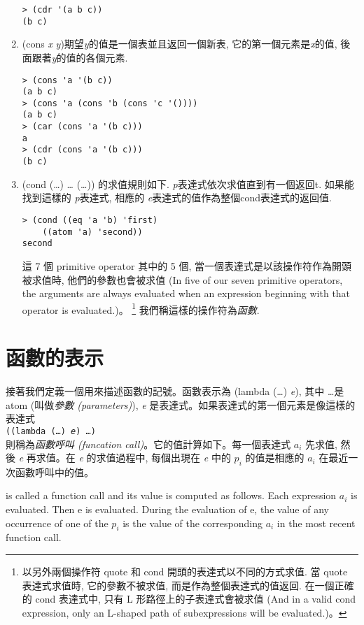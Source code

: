 \documentclass[12pt]{article}
\begin{document}
\begin{CJK}{UTF8}{bsmi}
\begin{enumerate}
\begin{verbatim} 
> (cdr '(a b c)) 
(b c) 
\end{verbatim} 
\item 
(cons {\it x} {\it y})期望{\it y}的值是一個表並且返回一個新表, 它的第一個元素是{\it x}的值,
後面跟著{\it y}的值的各個元素. 
\begin{verbatim} 
> (cons 'a '(b c)) 
(a b c) 
> (cons 'a (cons 'b (cons 'c '()))) 
(a b c) 
> (car (cons 'a '(b c))) 
a 
> (cdr (cons 'a '(b c))) 
(b c) 
\end{verbatim} 
\item 
(cond 
(\pone\dots\eone) 
\dots 
(\pn\dots\en)) 
的求值規則如下. 
{\it p}表達式依次求值直到有一個返回t. 
如果能找到這樣的{\it 
p}表達式, 相應的{\it 
e}表達式的值作為整個cond表達式的返回值. 
\begin{verbatim} 
> (cond ((eq 'a 'b) 'first) 
    ((atom 'a) 'second)) 
second 
\end{verbatim} 
這 7 個 primitive operator 其中的 5 個, 當一個表達式是以該操作符作為開頭被求值時, 他們的參數也會被求值
(In five of our seven primitive operators, the arguments are always evaluated 
when an expression beginning with that operator is evaluated.)。
\footnote{以另外兩個操作符 quote 和 cond 開頭的表達式以不同的方式求值.
當 quote 表達式求值時, 它的參數不被求值, 而是作為整個表達式的值返回. 
在一個正確的 cond 表達式中, 只有 L 形路徑上的子表達式會被求值
(And in a valid cond expression, only an L-shaped path of subexpressions will be evaluated.)。} 
我們稱這樣的操作符為{\em 函數}. 
\end{enumerate} 

\section{函數的表示} 

接著我們定義一個用來描述函數的記號。函數表示為
(lambda (\pone\dots\pn) {\it e}),
其中 \pone\dots\pn 是 atom (叫做{\em 參數 (parameters)}),
{\it e} 是表達式。如果表達式的第一個元素是像這樣的表達式\\
{\tt ((lambda (\pone\dots\pn) {\it e}) \aone\dots\an)} \\
則稱為{\em 函數呼叫 (funcation call)}。它的值計算如下。每一個表達式
{$a_{i}$} 先求值, 然後 {\it e} 再求值。在 {\it e}
的求值過程中, 每個出現在 {\it e} 中的 {$p_{i}$} 的值是相應的
{$a_{i}$} 在最近一次函數呼叫中的值。 

is called a function call and its value is computed as follows. Each expression
{$a_{i}$} is evaluated. Then e is evaluated. During the evaluation of e, the value of any occurrence of one of the {$p_{i}$} is the value of the corresponding {$a_{i}$} in the most
recent function call.


\end{CJK}
\end{document}
